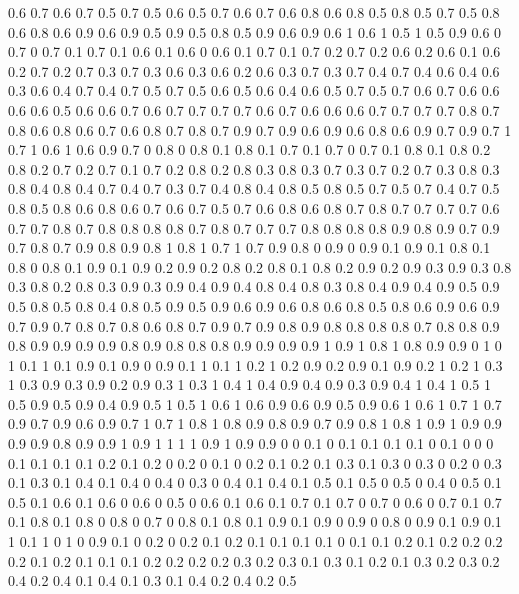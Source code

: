 0.6 0.7
0.6 0.7
0.5 0.7
0.5 0.6
0.5 0.7
0.6 0.7
0.6 0.8
0.6 0.8
0.5 0.8
0.5 0.7
0.5 0.8
0.6 0.8
0.6 0.9
0.6 0.9
0.5 0.9
0.5 0.8
0.5 0.9
0.6 0.9
0.6 1
0.6 1
0.5 1
0.5 0.9
0.6 0
0.7 0
0.7 0.1
0.7 0.1
0.6 0.1
0.6 0
0.6 0.1
0.7 0.1
0.7 0.2
0.7 0.2
0.6 0.2
0.6 0.1
0.6 0.2
0.7 0.2
0.7 0.3
0.7 0.3
0.6 0.3
0.6 0.2
0.6 0.3
0.7 0.3
0.7 0.4
0.7 0.4
0.6 0.4
0.6 0.3
0.6 0.4
0.7 0.4
0.7 0.5
0.7 0.5
0.6 0.5
0.6 0.4
0.6 0.5
0.7 0.5
0.7 0.6
0.7 0.6
0.6 0.6
0.6 0.5
0.6 0.6
0.7 0.6
0.7 0.7
0.7 0.7
0.6 0.7
0.6 0.6
0.6 0.7
0.7 0.7
0.7 0.8
0.7 0.8
0.6 0.8
0.6 0.7
0.6 0.8
0.7 0.8
0.7 0.9
0.7 0.9
0.6 0.9
0.6 0.8
0.6 0.9
0.7 0.9
0.7 1
0.7 1
0.6 1
0.6 0.9
0.7 0
0.8 0
0.8 0.1
0.8 0.1
0.7 0.1
0.7 0
0.7 0.1
0.8 0.1
0.8 0.2
0.8 0.2
0.7 0.2
0.7 0.1
0.7 0.2
0.8 0.2
0.8 0.3
0.8 0.3
0.7 0.3
0.7 0.2
0.7 0.3
0.8 0.3
0.8 0.4
0.8 0.4
0.7 0.4
0.7 0.3
0.7 0.4
0.8 0.4
0.8 0.5
0.8 0.5
0.7 0.5
0.7 0.4
0.7 0.5
0.8 0.5
0.8 0.6
0.8 0.6
0.7 0.6
0.7 0.5
0.7 0.6
0.8 0.6
0.8 0.7
0.8 0.7
0.7 0.7
0.7 0.6
0.7 0.7
0.8 0.7
0.8 0.8
0.8 0.8
0.7 0.8
0.7 0.7
0.7 0.8
0.8 0.8
0.8 0.9
0.8 0.9
0.7 0.9
0.7 0.8
0.7 0.9
0.8 0.9
0.8 1
0.8 1
0.7 1
0.7 0.9
0.8 0
0.9 0
0.9 0.1
0.9 0.1
0.8 0.1
0.8 0
0.8 0.1
0.9 0.1
0.9 0.2
0.9 0.2
0.8 0.2
0.8 0.1
0.8 0.2
0.9 0.2
0.9 0.3
0.9 0.3
0.8 0.3
0.8 0.2
0.8 0.3
0.9 0.3
0.9 0.4
0.9 0.4
0.8 0.4
0.8 0.3
0.8 0.4
0.9 0.4
0.9 0.5
0.9 0.5
0.8 0.5
0.8 0.4
0.8 0.5
0.9 0.5
0.9 0.6
0.9 0.6
0.8 0.6
0.8 0.5
0.8 0.6
0.9 0.6
0.9 0.7
0.9 0.7
0.8 0.7
0.8 0.6
0.8 0.7
0.9 0.7
0.9 0.8
0.9 0.8
0.8 0.8
0.8 0.7
0.8 0.8
0.9 0.8
0.9 0.9
0.9 0.9
0.8 0.9
0.8 0.8
0.8 0.9
0.9 0.9
0.9 1
0.9 1
0.8 1
0.8 0.9
0.9 0
1 0
1 0.1
1 0.1
0.9 0.1
0.9 0
0.9 0.1
1 0.1
1 0.2
1 0.2
0.9 0.2
0.9 0.1
0.9 0.2
1 0.2
1 0.3
1 0.3
0.9 0.3
0.9 0.2
0.9 0.3
1 0.3
1 0.4
1 0.4
0.9 0.4
0.9 0.3
0.9 0.4
1 0.4
1 0.5
1 0.5
0.9 0.5
0.9 0.4
0.9 0.5
1 0.5
1 0.6
1 0.6
0.9 0.6
0.9 0.5
0.9 0.6
1 0.6
1 0.7
1 0.7
0.9 0.7
0.9 0.6
0.9 0.7
1 0.7
1 0.8
1 0.8
0.9 0.8
0.9 0.7
0.9 0.8
1 0.8
1 0.9
1 0.9
0.9 0.9
0.9 0.8
0.9 0.9
1 0.9
1 1
1 1
0.9 1
0.9 0.9
0 0
0.1 0
0.1 0.1
0.1 0.1
0 0.1
0 0
0 0.1
0.1 0.1
0.1 0.2
0.1 0.2
0 0.2
0 0.1
0 0.2
0.1 0.2
0.1 0.3
0.1 0.3
0 0.3
0 0.2
0 0.3
0.1 0.3
0.1 0.4
0.1 0.4
0 0.4
0 0.3
0 0.4
0.1 0.4
0.1 0.5
0.1 0.5
0 0.5
0 0.4
0 0.5
0.1 0.5
0.1 0.6
0.1 0.6
0 0.6
0 0.5
0 0.6
0.1 0.6
0.1 0.7
0.1 0.7
0 0.7
0 0.6
0 0.7
0.1 0.7
0.1 0.8
0.1 0.8
0 0.8
0 0.7
0 0.8
0.1 0.8
0.1 0.9
0.1 0.9
0 0.9
0 0.8
0 0.9
0.1 0.9
0.1 1
0.1 1
0 1
0 0.9
0.1 0
0.2 0
0.2 0.1
0.2 0.1
0.1 0.1
0.1 0
0.1 0.1
0.2 0.1
0.2 0.2
0.2 0.2
0.1 0.2
0.1 0.1
0.1 0.2
0.2 0.2
0.2 0.3
0.2 0.3
0.1 0.3
0.1 0.2
0.1 0.3
0.2 0.3
0.2 0.4
0.2 0.4
0.1 0.4
0.1 0.3
0.1 0.4
0.2 0.4
0.2 0.5
